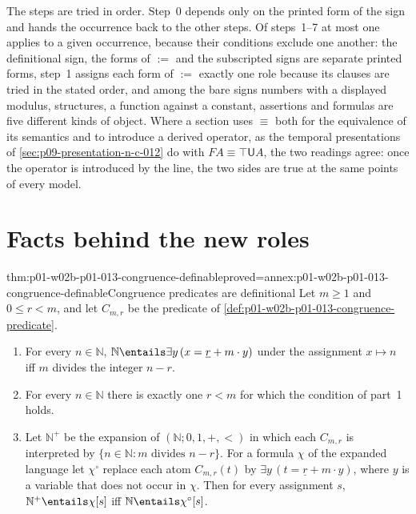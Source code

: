 The steps are tried in order.  Step~0 depends only on the printed form of
the sign and hands the occurrence back to the other steps.  Of steps~1--7
at most one applies to a given occurrence, because their conditions exclude
one another: the definitional sign, the forms of \(:=\) and the
subscripted signs are separate printed forms, step~1 assigns each form of
\(:=\) exactly one role because its clauses are tried in the stated order,
and among the bare signs numbers
with a displayed modulus, structures, a function against a constant,
assertions and formulas are five different kinds of object.  Where a section
uses \(\equiv\) both for the equivalence of its semantics and to introduce a
derived operator, as the temporal presentations of
\cref{sec:p09-presentation-n-c-012} do with \(FA\equiv\top\mathbin{\mathsf
U}A\), the two readings agree: once the operator is introduced by the line,
the two sides are true at the same points of every model.

\section{Facts behind the new roles}
\label{sec:p01-w02b-p01-013-facts}

\begin{hblemma}{thm:p01-w02b-p01-013-congruence-definable}{proved=annex:p01-w02b-p01-013-congruence-definable}{Congruence predicates are definitional}
Let \(m\geq1\) and \(0\leq r<m\), and let \(C_{m,r}\) be the predicate of
\cref{def:p01-w02b-p01-013-congruence-predicate}.
\begin{enumerate}
  \item For every \(n\in\mathbb N\),
  \(\mathbb N\entails\exists y\,(x=\underline r+m\cdot y)\) under the
  assignment \(x\mapsto n\) iff \(m\) divides the integer \(n-r\).
  \item For every \(n\in\mathbb N\) there is exactly one \(r<m\) for which
  the condition of part~1 holds.
  \item Let \(\mathbb N^{+}\) be the expansion of \((\mathbb
  N;0,1,+,<)\) in which each \(C_{m,r}\) is interpreted by
  \(\{n\in\mathbb N:m\text{ divides }n-r\}\).  For a formula \(\chi\) of the
  expanded language let \(\chi^{\circ}\) replace each atom \(C_{m,r}(t)\) by
  \(\exists y\,(t=\underline r+m\cdot y)\), where \(y\) is a variable that does
  not occur in \(\chi\).  Then for every assignment \(s\),
  \(\mathbb N^{+}\entails\chi[s]\) iff \(\mathbb N\entails\chi^{\circ}[s]\).
\end{enumerate}
\end{hblemma}


